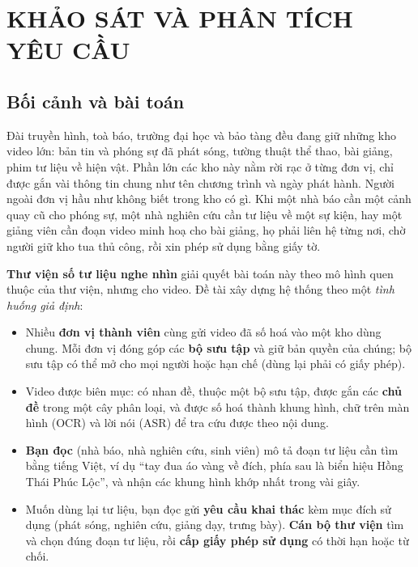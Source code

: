 \chapter{KHẢO SÁT VÀ PHÂN TÍCH YÊU CẦU}

\section{Bối cảnh và bài toán}

Đài truyền hình, toà báo, trường đại học và bảo tàng đều đang giữ những kho video lớn: bản
tin và phóng sự đã phát sóng, tường thuật thể thao, bài giảng, phim tư liệu về hiện vật.
Phần lớn các kho này nằm rời rạc ở từng đơn vị, chỉ được gắn vài thông tin chung như tên
chương trình và ngày phát hành. Người ngoài đơn vị hầu như không biết trong kho có gì. Khi
một nhà báo cần một cảnh quay cũ cho phóng sự, một nhà nghiên cứu cần tư liệu về một sự
kiện, hay một giảng viên cần đoạn video minh hoạ cho bài giảng, họ phải liên hệ từng nơi,
chờ người giữ kho tua thủ công, rồi xin phép sử dụng bằng giấy tờ.

\textbf{Thư viện số tư liệu nghe nhìn} giải quyết bài toán này theo mô hình quen thuộc của
thư viện, nhưng cho video. Đề tài xây dựng hệ thống theo một \textit{tình huống giả định}:
\begin{itemize}
    \item Nhiều \textbf{đơn vị thành viên} cùng gửi video đã số hoá vào một kho dùng chung.
    Mỗi đơn vị đóng góp các \textbf{bộ sưu tập} và giữ bản quyền của chúng; bộ sưu tập có thể
    mở cho mọi người hoặc hạn chế (dùng lại phải có giấy phép).
    \item Video được biên mục: có nhan đề, thuộc một bộ sưu tập, được gắn các \textbf{chủ đề}
    trong một cây phân loại, và được số hoá thành khung hình, chữ trên màn hình (OCR) và lời
    nói (ASR) để tra cứu được theo nội dung.
    \item \textbf{Bạn đọc} (nhà báo, nhà nghiên cứu, sinh viên) mô tả đoạn tư liệu cần tìm
    bằng tiếng Việt, ví dụ ``tay đua áo vàng về đích, phía sau là biển hiệu Hồng Thái Phúc
    Lộc'', và nhận các khung hình khớp nhất trong vài giây.
    \item Muốn dùng lại tư liệu, bạn đọc gửi \textbf{yêu cầu khai thác} kèm mục đích sử dụng
    (phát sóng, nghiên cứu, giảng dạy, trưng bày). \textbf{Cán bộ thư viện} tìm và chọn đúng
    đoạn tư liệu, rồi \textbf{cấp giấy phép sử dụng} có thời hạn hoặc từ chối.
\end{itemize}

